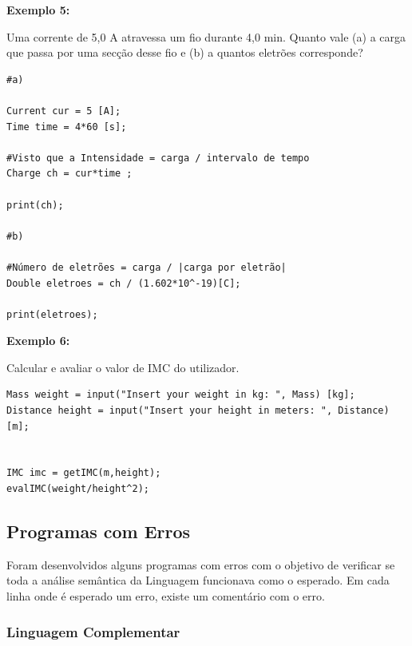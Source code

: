 \documentclass[10pt,portuguese]{article}
\begin{document}
\par \textbf{Exemplo 5:}

\par Uma corrente de 5,0 A atravessa um fio durante 4,0 min. Quanto vale (a) a carga que passa por uma secção desse fio e (b) a quantos eletrões corresponde?

\begin{lstlisting}[numbers=none]
#a)

Current cur = 5 [A];
Time time = 4*60 [s];

#Visto que a Intensidade = carga / intervalo de tempo
Charge ch = cur*time ;

print(ch);

#b)

#Número de eletrões = carga / |carga por eletrão|
Double eletroes = ch / (1.602*10^-19)[C];

print(eletroes);
\end{lstlisting}

\par \textbf{Exemplo 6:}

\par Calcular e avaliar o valor de IMC do utilizador.

\begin{lstlisting}[numbers=none]
Mass weight = input("Insert your weight in kg: ", Mass) [kg];
Distance height = input("Insert your height in meters: ", Distance) [m];


IMC imc = getIMC(m,height);
evalIMC(weight/height^2);
\end{lstlisting}

\clearpage

\subsection{Programas com Erros}

\par Foram desenvolvidos alguns programas com erros com o objetivo de verificar se toda a análise semântica da Linguagem funcionava como o esperado. Em cada linha onde é esperado um erro, existe um comentário com o erro.

\subsubsection{Linguagem Complementar}
\end{document}
